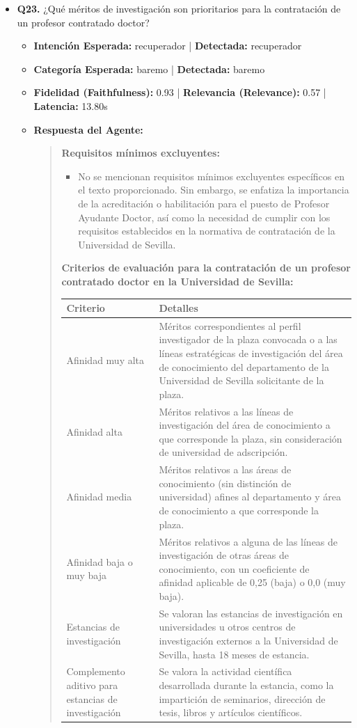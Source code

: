 \documentclass[12pt,a4paper,oneside]{report}
\begin{document}
\begin{itemize}
  
\item \textbf{Q23.} ¿Qué méritos de investigación son prioritarios para la contratación de un profesor contratado doctor? \\
        \begin{itemize}
          \item \textbf{Intención Esperada:} recuperador | \textbf{Detectada:} recuperador
          \item \textbf{Categoría Esperada:} baremo | \textbf{Detectada:} baremo
          \item \textbf{Fidelidad (Faithfulness):} 0.93 | \textbf{Relevancia (Relevance):} 0.57 | \textbf{Latencia:} 13.80s
          \item \textbf{{Respuesta del Agente:}} \\
                \begin{quote}
\textbf{Requisitos mínimos excluyentes:}
\begin{itemize}
  \item No se mencionan requisitos mínimos excluyentes específicos en el texto proporcionado. Sin embargo, se enfatiza la importancia de la acreditación o habilitación para el puesto de Profesor Ayudante Doctor, así como la necesidad de cumplir con los requisitos establecidos en la normativa de contratación de la Universidad de Sevilla.
\end{itemize}

\textbf{Criterios de evaluación para la contratación de un profesor contratado doctor en la Universidad de Sevilla:}


\begin{tabular}{p{3.5cm} p{8cm}}
\toprule
\textbf{Criterio} & \textbf{Detalles} \\
\midrule
Afinidad muy alta & Méritos correspondientes al perfil investigador de la plaza convocada o a las líneas estratégicas de investigación del área de conocimiento del departamento de la Universidad de Sevilla solicitante de la plaza. \\
Afinidad alta & Méritos relativos a las líneas de investigación del área de conocimiento a que corresponde la plaza, sin consideración de universidad de adscripción. \\
Afinidad media & Méritos relativos a las áreas de conocimiento (sin distinción de universidad) afines al departamento y área de conocimiento a que corresponde la plaza. \\
Afinidad baja o muy baja & Méritos relativos a alguna de las líneas de investigación de otras áreas de conocimiento, con un coeficiente de afinidad aplicable de 0,25 (baja) o 0,0 (muy baja). \\
Estancias de investigación & Se valoran las estancias de investigación en universidades u otros centros de investigación externos a la Universidad de Sevilla, hasta 18 meses de estancia. \\
Complemento aditivo para estancias de investigación & Se valora la actividad científica desarrollada durante la estancia, como la impartición de seminarios, dirección de tesis, libros y artículos científicos. \\
\bottomrule
\end{tabular}



\end{quote}
\end{itemize}
\end{itemize}
\end{document}
